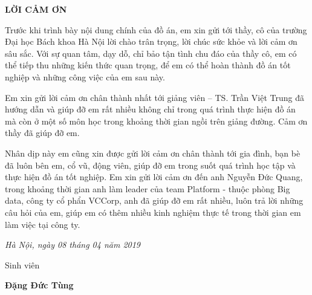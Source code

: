 \vspace*{2cm}
\centerline{\bf \large\MakeUppercase{Lời cảm ơn}}
\vspace{20pt}

Trước khi trình bày nội dung chính của đồ án, em xin gửi tới thầy, cô của trường Đại học Bách khoa Hà Nội lời chào trân trọng, lời chúc sức khỏe và lời cảm ơn sâu sắc. Với sự quan tâm, dạy dỗ, chỉ bảo tận tình chu đáo của thầy cô, em có thể tiếp thu những kiến thức quan trọng, để em có thể hoàn thành đồ án tốt nghiệp và những công việc của em sau này.

Em xin gửi lời cảm ơn chân thành nhất tới giảng viên – TS. Trần Việt Trung đã hướng dẫn và giúp đỡ em rất nhiều không chỉ trong quá trình thực hiện đồ án mà còn ở một số môn học trong khoảng thời gian ngồi trên giảng đường. Cảm ơn thầy đã giúp đỡ em.

Nhân dịp này em cũng xin được gửi lời cảm ơn chân thành tới gia đình, bạn bè đã luôn bên em, cổ vũ, động viên, giúp đỡ em trong suốt quá trình học tập và thực hiện đồ án tốt nghiệp. Em xin gửi lời cảm ơn đến anh Nguyễn Đức Quang, trong khoảng thời gian anh làm leader của team Platform - thuộc phòng Big data, công ty cổ phẩn VCCorp, anh đã giúp đỡ em rất nhiều, luôn trả lời những câu hỏi của em, giúp em có thêm nhiều kinh nghiệm thực tế trong thời gian em làm việc tại công ty. 

 \begin{flushright}
{\it Hà Nội, ngày 08 tháng 04 năm 2019}

\vspace*{0.7cm}
Sinh viên \hskip 2cm\quad

\vspace*{0.7cm}
{\bf Đặng Đức Tùng} \hskip 1cm \quad\ 
 \end{flushright}

